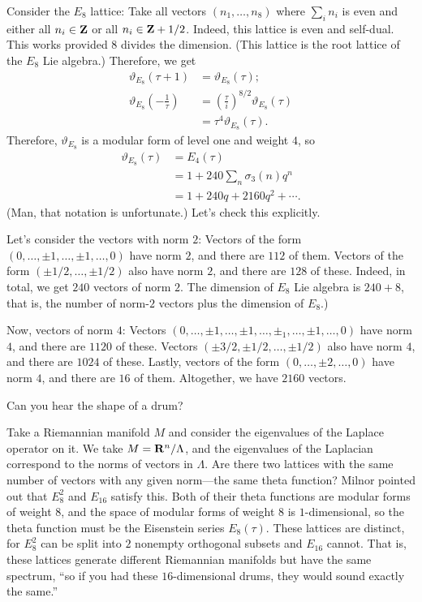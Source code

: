 \documentclass[11pt, oneside,margin=1in]{article}
\begin{document}
Consider the $E_8$ lattice: Take all vectors $(n_1,\hdots, n_8)$ where $\sum_{i}^{} n_i$ is even and either all $n_i\in \mathbf Z$ or all $n_i\in \mathbf Z+1/2$. Indeed, this lattice is even and self-dual. This works provided $8$ divides the dimension. (This lattice is the root lattice of the $E_8$ Lie algebra.) Therefore, we get
\begin{align*}
	\vartheta_{E_8 }(\tau + 1) &= \vartheta_{E_8 }(\tau) ;\\
	\vartheta_{E_8 } \left( -\frac{1}{\tau} \right) &= \left( \frac{\tau}{i} \right) ^{8/2} \vartheta_{E_8 }(\tau)\\
							&= \tau^{4} \vartheta_{E_8 } (\tau).
\end{align*}
Therefore, $\vartheta_{E_8 }$ is a modular form of level one and weight $4$, so
\begin{align*}
	\vartheta_{E_8 } (\tau) &=  E_4(\tau) \\
				&= 1 +240 \sum_{n}^{} \sigma_3(n)q^n\\
				&= 1 + 240q + 2160q^2 + \cdots.
\end{align*}
(Man, that notation is unfortunate.)  Let's check this explicitly.

Let's consider the vectors with norm $2$: Vectors of the form $(0,\hdots, \pm 1,\hdots,\pm 1,\hdots,0)$ have norm $2$, and there are $112$ of them. Vectors of the form $(\pm 1/2,\hdots,\pm 1/2)$ also have norm $2$, and there are $128$ of these. Indeed, in total, we get $240$ vectors of norm $2$. The dimension of $E_8$ Lie algebra is $240 + 8$, that is, the number of norm-$2$ vectors plus the dimension of $E_8$.) 

Now, vectors of norm $4$: Vectors $(0,\hdots,\pm 1,\hdots,\pm 1,\hdots, \pm_1,\hdots,\pm 1,\hdots, 0)$ have norm $4$, and there are $1120$ of these. Vectors $(\pm 3/2,\pm 1/2,\hdots, \pm 1/2)$ also have norm $4$, and there are $1024$ of these. Lastly, vectors of the form  $(0,\hdots, \pm 2,\hdots, 0)$ have norm $4$, and there are $16$ of them. Altogether, we have $2160$ vectors.

\begin{problem}
	Can you hear the shape of a drum?
\end{problem}

Take a Riemannian manifold $M$ and consider the eigenvalues of the Laplace operator on it. We take $M=\mathbf R^n/\Lambda$, and the eigenvalues of the Laplacian correspond to the norms of vectors in $\Lambda$. Are there two lattices with the same number of vectors with any given norm---the same theta function? Milnor pointed out that $E_8^2$ and $E_{16}$ satisfy this. Both of their theta functions are modular forms of weight $8$, and the space of modular forms of weight $8$ is $1$-dimensional, so the theta function must be the Eisenstein series $E_8(\tau)$. These lattices are distinct, for $E_8^2$ can be split into $2$ nonempty orthogonal subsets and $E_{16}$ cannot. That is, these lattices generate different Riemannian manifolds but have the same spectrum, ``so if you had these $16$-dimensional drums, they would sound exactly the same.''
\end{document}
